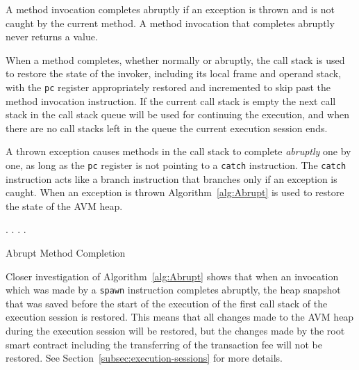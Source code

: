 \documentclass[11pt, a4paper]{report}
\begin{document}
    A method invocation completes abruptly if an exception is thrown and is not caught by the current method. A
    method invocation that completes abruptly never returns a value.

    When a method completes, whether normally or abruptly, the call stack is used to restore the state of the invoker,
    including its local frame and operand stack, with the \texttt{pc} register appropriately restored and incremented
    to skip past the method invocation instruction. If the current call stack is empty the next call stack in the call
    stack queue will be used for continuing the execution, and when there are no call stacks left in the queue the
    current execution session ends.

    A thrown exception causes methods in the call stack to complete \emph{abruptly} one by one, as long as the
    \texttt{pc} register is not pointing to a \texttt{catch} instruction. The \texttt{catch} instruction acts like a
    branch instruction that branches only if an exception is caught. When an exception is thrown
    Algorithm~\ref{alg:Abrupt} is used to restore the state of the AVM heap.

    \begin{algorithm}
        \DontPrintSemicolon

        {
            \Stack.\Pop{}\;
            {
                \Heap.\Restore{}\;
            }{
                \Heap.\Discard{}\;
            }
        }
        \Heap.\Restore{}\;
        \caption{Abrupt Method Completion}\label{alg:Abrupt}
    \end{algorithm}

    Closer investigation of Algorithm~\ref{alg:Abrupt} shows that when an invocation which was made by
    a \texttt{spawn} instruction completes abruptly, the heap snapshot that was saved before the start of the
    execution of the first call stack of the execution session is restored. This means
    that all changes made to the AVM heap during the execution session will be restored, but the changes made by
    the root smart contract including the transferring of the transaction fee will not be restored.
    See Section~\ref{subsec:execution-sessions} for more details.
\end{document}
